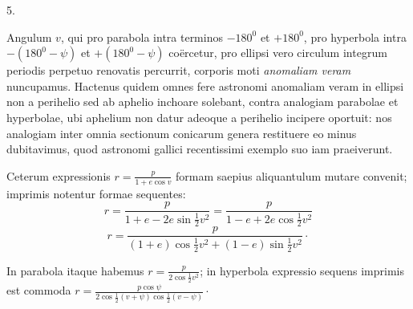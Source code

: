 \begin{center}
5.
\end{center}
Angulum $v$, qui pro parabola intra terminos $-180^0$ et $+180^0$, pro hyperbola intra
$-(180^0-\psi)$ et $+(180^0-\psi)$ coërcetur, pro ellipsi vero circulum integrum periodis
perpetuo renovatis percurrit, corporis moti \emph{anomaliam veram} nuncupamus. Hactenus
quidem omnes fere astronomi anomaliam veram in ellipsi non a perihelio sed ab aphelio
inchoare solebant, contra analogiam parabolae et hyperbolae, ubi aphelium non datur
adeoque a perihelio incipere oportuit: nos analogiam inter omnia sectionum conicarum
genera restituere
eo minus dubitavimus, quod astronomi gallici recentissimi exemplo suo iam praeiverunt.

Ceterum expressionis $r = \frac{p}{1+e\cos v}$ formam saepius aliquantulum mutare
convenit; imprimis notentur formae sequentes:
\[
r = \frac{p}{1+e-2e\sin\frac{1}{2}v^2} = \frac{p}{1-e+2e\cos\frac{1}{2}v^2}
\]
\[
r = \frac{p}{(1+e)\cos\frac{1}{2}v^2+(1-e)\sin\frac{1}{2}v^2}\cdot
\]

In parabola itaque habemus $r = \frac{p}{2\cos\frac{1}{2}v^2}$; in hyperbola expressio
sequens imprimis est commoda $r = \frac{p\cos\psi}{2\cos\frac{1}{2}(v+\psi)\cos\frac{1}{2}(v-\psi)}\cdot$
